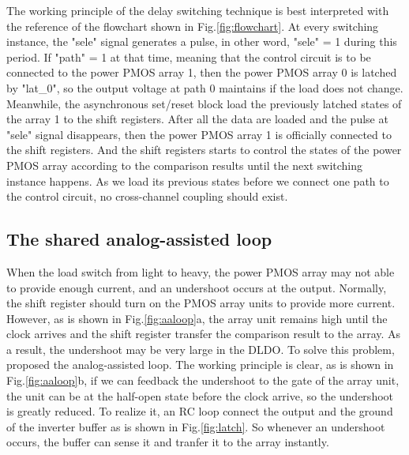 \documentclass[journal]{IEEEtran}
\begin{document}
The working principle of the delay switching technique is best interpreted with the reference of the flowchart shown in Fig.\ref{fig:flowchart}. At every switching instance, the "sele" signal generates a pulse, in other word, "sele" = 1 during this period. If "path" = 1 at that time, meaning that the control circuit is to be connected to the power PMOS array 1, then the power PMOS array 0 is latched by "lat\_0", so the output voltage at path 0 maintains if the load does not change. Meanwhile, the asynchronous set/reset block load the previously latched states of the array 1 to the shift registers. After all the data are loaded and the pulse at "sele" signal disappears, then the power PMOS array 1 is officially connected to the shift registers. And the shift registers starts to control the states of the power PMOS array according to the comparison results until the next switching instance happens. As we load its previous states before we connect one path to the control circuit, no cross-channel coupling should exist.

\subsection{The shared analog-assisted loop}
When the load switch from light to heavy, the power PMOS array may not able to provide enough current, and an undershoot occurs at the output. Normally, the shift register should turn on the PMOS array units to provide more current. However, as is shown in Fig.\ref{fig:aaloop}a, the array unit remains high until the clock arrives and the shift register transfer the comparison result to the array. As a result, the undershoot may be very large in the DLDO. To solve this problem, \cite{AALDO} proposed the analog-assisted loop. The working principle is clear, as is shown in Fig.\ref{fig:aaloop}b, if we can feedback the undershoot to the gate of the array unit, the unit can be at the half-open state before the clock arrive, so the undershoot is greatly reduced. To realize it, an RC loop connect the output and the ground of the inverter buffer as is shown in Fig.\ref{fig:latch}. So whenever an undershoot occurs, the buffer can sense it and tranfer it to the array instantly.
\end{document}
